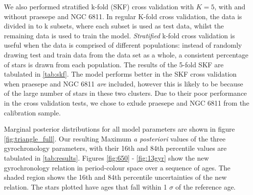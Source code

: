 \documentclass[12pt,preprint]{aastex}
\begin{document}
We also performed stratified k-fold (SKF) cross validation with $K=5$, with and without praesepe and NGC 6811.
In regular K-fold cross validation, the data is divided in to k subsets, where each subset is used as test data, whilst the remaining data is used to train the model.
\emph{Stratified} k-fold cross validation is useful when the data is comprised of different populations: instead of randomly drawing test and train data from the data set as a whole, a consistent percentage of stars is drawn from each population.
The results of the 5-fold SKF are tabulated in \ref{tab:skf}.
The model performs better in the SKF cross validation when praesepe and NGC 6811 \emph{are} included, however this is likely to be because of the large number of stars in these two clusters.
Due to their poor performance in the cross validation tests, we chose to exlude praesepe and NGC 6811 from the calibration sample.

Marginal posterior distributions for all model parameters are shown in figure \ref{fig:triangle_full}.
Our resulting Maximum \emph{a posteriori} values of the three gyrochronology parameters, with their 16th and 84th percentile values are tabulated in \ref{tab:results}.
Figures \ref{fig:650} - \ref{fig:13gyr} show the new gyrochronology relation in period-colour space over a sequence of ages.
The shaded region shows the 16th and 84th percentile uncertainties of the new relation.
The stars plotted have ages that fall within 1 $\sigma$ of the reference age.

\end{document}
